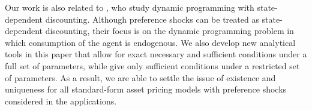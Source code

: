 \documentclass[12pt, reqno]{amsart}
\newcommand{\1}{\mathbbm 1}
\theoremstyle{plain}
\theoremstyle{definition}
\begin{document}
%


Our work is also related to \cite{stachurski2021dynamic}, who study dynamic
programming with state-dependent discounting. Although preference shocks can
be treated as state-dependent discounting, their focus is on the dynamic
programming problem in which consumption of the agent is endogenous. We also
develop new analytical tools in this paper that allow for exact necessary and
sufficient conditions under a full set of parameters, while
\cite{stachurski2021dynamic} give only sufficient conditions under a
restricted set of parameters. As a result, we are able to settle the issue of
existence and uniqueness for all standard-form asset pricing models with preference shocks
considered in the applications.
\end{document}
